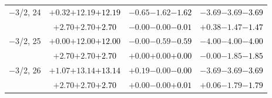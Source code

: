 \documentclass[compress]{beamer}
\begin{document}
\begin{frame}
\begin{tabular}{r | c | c | c}
$-$3/2, 24 & $+0.32$\hspace{0.1 cm}$+12.19$\hspace{0.1 cm}\textcolor{black}{$+12.19$} & $-0.65$\hspace{0.1 cm}$-1.62$\hspace{0.1 cm}\textcolor{black}{$-1.62$} & $-3.69$\hspace{0.1 cm}$-3.69$\hspace{0.1 cm}\textcolor{black}{$-3.69$} \\
           & $+2.70$\hspace{0.1 cm}$+2.70$\hspace{0.1 cm}\textcolor{black}{$+2.70$} & $-0.00$\hspace{0.1 cm}$-0.00$\hspace{0.1 cm}\textcolor{black}{$-0.01$} & $+0.38$\hspace{0.1 cm}$-1.47$\hspace{0.1 cm}\textcolor{black}{$-1.47$} \\
$-$3/2, 25 & $+0.00$\hspace{0.1 cm}$+12.00$\hspace{0.1 cm}\textcolor{black}{$+12.00$} & $-0.00$\hspace{0.1 cm}$-0.59$\hspace{0.1 cm}\textcolor{black}{$-0.59$} & $-4.00$\hspace{0.1 cm}$-4.00$\hspace{0.1 cm}\textcolor{black}{$-4.00$} \\
           & $+2.70$\hspace{0.1 cm}$+2.70$\hspace{0.1 cm}\textcolor{black}{$+2.70$} & $+0.00$\hspace{0.1 cm}$+0.00$\hspace{0.1 cm}\textcolor{black}{$+0.00$} & $-0.00$\hspace{0.1 cm}$-1.85$\hspace{0.1 cm}\textcolor{black}{$-1.85$} \\
$-$3/2, 26 & $+1.07$\hspace{0.1 cm}$+13.14$\hspace{0.1 cm}\textcolor{black}{$+13.14$} & $+0.19$\hspace{0.1 cm}$-0.00$\hspace{0.1 cm}\textcolor{black}{$-0.00$} & $-3.69$\hspace{0.1 cm}$-3.69$\hspace{0.1 cm}\textcolor{black}{$-3.69$} \\
           & $+2.70$\hspace{0.1 cm}$+2.70$\hspace{0.1 cm}\textcolor{black}{$+2.70$} & $+0.00$\hspace{0.1 cm}$-0.00$\hspace{0.1 cm}\textcolor{black}{$+0.01$} & $+0.06$\hspace{0.1 cm}$-1.79$\hspace{0.1 cm}\textcolor{black}{$-1.79$} \\

\end{tabular}
\end{frame}
\end{document}
